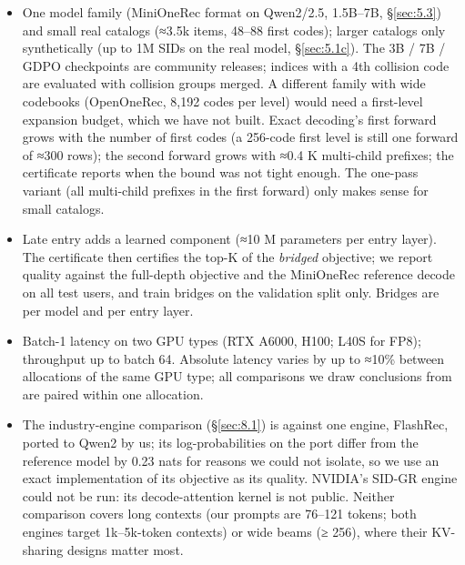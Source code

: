\documentclass[11pt]{article}
\begin{document}
\begin{itemize}
\item One model family (MiniOneRec format on Qwen2/2.5, 1.5B–7B, \S\ref{sec:5.3}) and small real catalogs (≈3.5k items, 48–88 first codes); larger catalogs only synthetically (up to 1M SIDs on the real model, \S\ref{sec:5.1c}). The 3B / 7B / GDPO checkpoints are community releases; indices with a 4th collision code are evaluated with collision groups merged. A different family with wide codebooks (OpenOneRec, 8,192 codes per level) would need a first-level expansion budget, which we have not built. Exact decoding's first forward grows with the number of first codes (a 256-code first level is still one forward of ≈300 rows); the second forward grows with ≈0.4 K multi-child prefixes; the certificate reports when the bound was not tight enough. The one-pass variant (all multi-child prefixes in the first forward) only makes sense for small catalogs.
\item Late entry adds a learned component (≈10 M parameters per entry layer). The certificate then certifies the top-K of the \emph{bridged} objective; we report quality against the full-depth objective and the MiniOneRec reference decode on all test users, and train bridges on the validation split only. Bridges are per model and per entry layer.
\item Batch-1 latency on two GPU types (RTX A6000, H100; L40S for FP8); throughput up to batch 64. Absolute latency varies by up to ≈10\% between allocations of the same GPU type; all comparisons we draw conclusions from are paired within one allocation.
\item The industry-engine comparison (\S\ref{sec:8.1}) is against one engine, FlashRec, ported to Qwen2 by us; its log-probabilities on the port differ from the reference model by 0.23 nats for reasons we could not isolate, so we use an exact implementation of its objective as its quality. NVIDIA's SID-GR engine could not be run: its decode-attention kernel is not public. Neither comparison covers long contexts (our prompts are 76–121 tokens; both engines target 1k–5k-token contexts) or wide beams (≥ 256), where their KV-sharing designs matter most.
\end{itemize}



\end{document}

